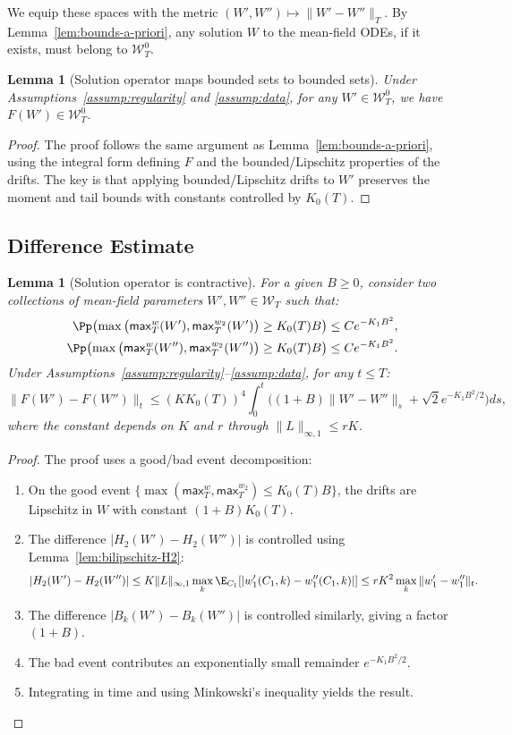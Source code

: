 \documentclass[nohyperref]{article}
\theoremstyle{plain}
\newtheorem{lemma}[theorem]{Lemma}
\theoremstyle{definition}
\theoremstyle{remark}
\begin{document}
We equip these spaces with the metric $(W',W'')\mapsto \|W'-W''\|_T$. By Lemma~\ref{lem:bounds-a-priori}, any solution $W$ to the mean-field ODEs, if it exists, must belong to $\mathcal{W}_T^0$.

\begin{lemma}[Solution operator maps bounded sets to bounded sets]
\label{lem:invariance-F}
Under Assumptions~\ref{assump:regularity} and \ref{assump:data}, for any $W'\in\mathcal{W}_T^0$, we have $F(W')\in\mathcal{W}_T^0$.
\end{lemma}

\begin{proof}
The proof follows the same argument as Lemma~\ref{lem:bounds-a-priori}, using the integral form defining $F$ and the bounded/Lipschitz properties of the drifts. The key is that applying bounded/Lipschitz drifts to $W'$ preserves the moment and tail bounds with constants controlled by $K_0(T)$.
\end{proof}

\subsection{Difference Estimate}

\begin{lemma}[Solution operator is contractive]
\label{lem:difference-F}
For a given $B\ge 0$, consider two collections of mean-field parameters $W',W''\in\mathcal{W}_T$ such that:
\begin{align*}
\Pp\!\left(\max\big(\mathsf{max}_T^w(W'), \mathsf{max}_T^{w_2}(W')\big)\ge K_0(T)B\right) &\le C e^{-K_1 B^2},\\
\Pp\!\left(\max\big(\mathsf{max}_T^w(W''), \mathsf{max}_T^{w_2}(W'')\big)\ge K_0(T)B\right) &\le C e^{-K_1 B^2}.
\end{align*}
Under Assumptions~\ref{assump:regularity}--\ref{assump:data}, for any $t\le T$:
\[
\|F(W')-F(W'')\|_t \le (KK_0(T))^4 \int_0^t \Big((1+B)\|W'-W''\|_s + \sqrt{2}e^{-K_1 B^2/2}\Big)ds,
\]
where the constant depends on $K$ and $r$ through $\|L\|_{\infty,1}\le rK$.
\end{lemma}

\begin{proof}
The proof uses a good/bad event decomposition:
\begin{enumerate}
\item On the good event $\{\max(\mathsf{max}_T^w, \mathsf{max}_T^{w_2})\le K_0(T)B\}$, the drifts are Lipschitz in $W$ with constant $(1+B)K_0(T)$.
\item The difference $|H_2(W')-H_2(W'')|$ is controlled using Lemma~\ref{lem:bilipschitz-H2}:
\[
|H_2(W')-H_2(W'')| \le K\|L\|_{\infty,1}\max_k\E_{C_1}[|w_1'(C_1,k)-w_1''(C_1,k)|] \le rK^2\max_k\|w_1'-w_1''\|_t.
\]
\item The difference $|B_k(W')-B_k(W'')|$ is controlled similarly, giving a factor $(1+B)$.
\item The bad event contributes an exponentially small remainder $e^{-K_1 B^2/2}$.
\item Integrating in time and using Minkowski's inequality yields the result.
\end{enumerate}
\end{proof}
\end{document}
